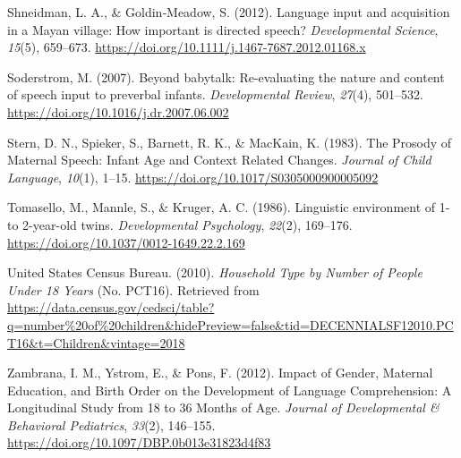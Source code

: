 \documentclass[
  english,
  man,floatsintext]{apa6}
\newlength{\cslhangindent}
\newlength{\cslentryspacingunit} %
\newenvironment{CSLReferences}[2] %
 {%
  \setlength{\parindent}{0pt}
  \ifodd #1
  \let\oldpar\par
  \def\par{\hangindent=\cslhangindent\oldpar}
  \fi
  \setlength{\parskip}{#2\cslentryspacingunit}
 }%
 {}
\begin{document}
\begin{CSLReferences}{1}{0}
\leavevmode{}%
Shneidman, L. A., \& Goldin‐Meadow, S. (2012). Language input and acquisition in a {Mayan} village: How important is directed speech? \emph{Developmental Science}, \emph{15}(5), 659--673. \url{https://doi.org/10.1111/j.1467-7687.2012.01168.x}

\leavevmode{}%
Soderstrom, M. (2007). Beyond babytalk: {Re}-evaluating the nature and content of speech input to preverbal infants. \emph{Developmental Review}, \emph{27}(4), 501--532. \url{https://doi.org/10.1016/j.dr.2007.06.002}

\leavevmode{}%
Stern, D. N., Spieker, S., Barnett, R. K., \& MacKain, K. (1983). The {Prosody} of {Maternal} {Speech}: {Infant} {Age} and {Context} {Related} {Changes}. \emph{Journal of Child Language}, \emph{10}(1), 1--15. \url{https://doi.org/10.1017/S0305000900005092}

\leavevmode{}%
Tomasello, M., Mannle, S., \& Kruger, A. C. (1986). Linguistic environment of 1- to 2-year-old twins. \emph{Developmental Psychology}, \emph{22}(2), 169--176. \url{https://doi.org/10.1037/0012-1649.22.2.169}

\leavevmode{}%
United States Census Bureau. (2010). \emph{Household {Type} by {Number} of {People} {Under} 18 {Years}} (No. PCT16). Retrieved from \url{https://data.census.gov/cedsci/table?q=number\%20of\%20children\&hidePreview=false\&tid=DECENNIALSF12010.PCT16\&t=Children\&vintage=2018}

\leavevmode{}%
Zambrana, I. M., Ystrom, E., \& Pons, F. (2012). Impact of {Gender}, {Maternal} {Education}, and {Birth} {Order} on the {Development} of {Language} {Comprehension}: {A} {Longitudinal} {Study} from 18 to 36 {Months} of {Age}. \emph{Journal of Developmental \& Behavioral Pediatrics}, \emph{33}(2), 146--155. \url{https://doi.org/10.1097/DBP.0b013e31823d4f83}

\end{CSLReferences}

\endgroup
\end{document}
